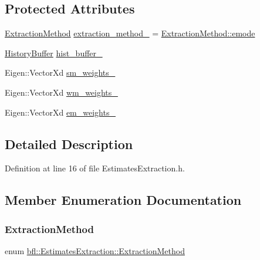 \subsection*{Protected Attributes}
\begin{DoxyCompactItemize}
\item 
\mbox{\hyperlink{classbfl_1_1EstimatesExtraction_a8489976af4025f0bbc3288ff7f17ffb0}{Extraction\+Method}} \mbox{\hyperlink{classbfl_1_1EstimatesExtraction_a2dcf07e017ecb16b63c882538f74c9bf}{extraction\+\_\+method\+\_\+}} = \mbox{\hyperlink{classbfl_1_1EstimatesExtraction_a8489976af4025f0bbc3288ff7f17ffb0a68aa9a30f26a7648656847fd30c44144}{Extraction\+Method\+::emode}}
\item 
\mbox{\hyperlink{classbfl_1_1HistoryBuffer}{History\+Buffer}} \mbox{\hyperlink{classbfl_1_1EstimatesExtraction_a462d98248435b91eda5195560f598dbd}{hist\+\_\+buffer\+\_\+}}
\item 
Eigen\+::\+Vector\+Xd \mbox{\hyperlink{classbfl_1_1EstimatesExtraction_a67e12e5691da329997a10b334749ab1f}{sm\+\_\+weights\+\_\+}}
\item 
Eigen\+::\+Vector\+Xd \mbox{\hyperlink{classbfl_1_1EstimatesExtraction_aeeea600b8591d00e0c15939a0684b77a}{wm\+\_\+weights\+\_\+}}
\item 
Eigen\+::\+Vector\+Xd \mbox{\hyperlink{classbfl_1_1EstimatesExtraction_af14ee077a6ff541973570a1f8ede9382}{em\+\_\+weights\+\_\+}}
\end{DoxyCompactItemize}


\subsection{Detailed Description}


Definition at line 16 of file Estimates\+Extraction.\+h.



\subsection{Member Enumeration Documentation}
\mbox{\label{classbfl_1_1EstimatesExtraction_a8489976af4025f0bbc3288ff7f17ffb0}} 
\subsubsection{\texorpdfstring{Extraction\+Method}{ExtractionMethod}}
{\footnotesize\ttfamily enum \mbox{\hyperlink{classbfl_1_1EstimatesExtraction_a8489976af4025f0bbc3288ff7f17ffb0}{bfl\+::\+Estimates\+Extraction\+::\+Extraction\+Method}}\hspace{0.3cm}{\ttfamily [strong]}}

